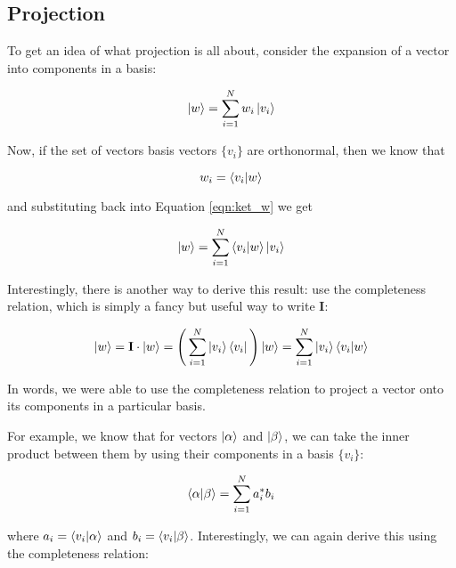 \documentclass[11pt, oneside]{article}   	%
\begin{document}
\subsection{Projection}
To get an idea of what projection is all about, consider the expansion of a vector into components in a basis:

\begin{equation}
\ket{w} =  \sum\limits_{i = 1}^{N} w_i \ket{v_i}
\label{eqn:ket_w}
\end{equation}

\bigskip
\noindent
Now, if the set of vectors basis vectors  $\{v_i\}$ are orthonormal, then we know that 

\begin{equation*}
w_i  =  \braket{v_i  | w}
\end{equation*}

\bigskip
\noindent
and substituting back into Equation \ref{eqn:ket_w} we get

\begin{equation*}
\ket{w} =  \sum\limits_{i = 1}^{N}  \braket{v_i  | w} \ket{v_i}
\end{equation*}

\bigskip
\noindent
Interestingly, there is another way to derive this result:  use the completeness relation, which is simply a fancy but useful way to write \textbf{I}:

\begin{equation*}
\ket{w} =  \mathbf{I} \cdot \ket{w} =  \Bigg (\sum\limits_{i = 1}^{N}  \ket{v_i} \bra{v_i} \Bigg ) \ket{w} = \sum\limits_{i = 1}^{N}  \ket{v_i} \braket{v_i | w}
\end{equation*} 

\bigskip
\noindent
In words, we were able to use the completeness relation to project a vector onto its components in a particular basis.

\bigskip
\noindent
For example, we know that for vectors $\ket{\alpha}$ and $\ket{\beta}$, we can take the inner product between them by using their components in a basis $\{v_i\}$:

\bigskip
\begin{equation*}
\braket{\alpha  | \beta} = \sum\limits_{i = 1}^{N} a_i^* b_i
\end{equation*} 

\bigskip
\noindent
where $a_i = \braket{v_i | \alpha}$ and $b_i = \braket{v_i | \beta}$. Interestingly, we can again derive this using the completeness relation:

%
%
%
\end{document}

